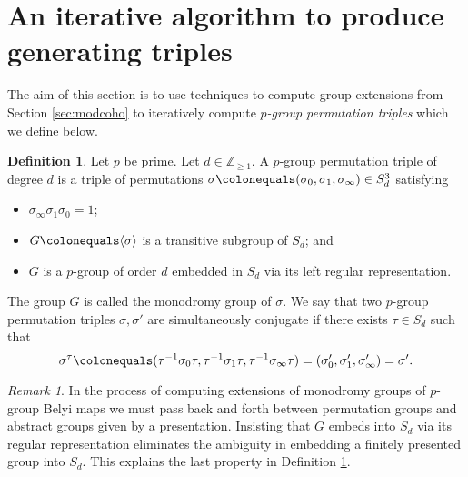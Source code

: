 \documentclass{dcthesis}
\newcommand{\ZZ}{\mathbb Z}
\newcommand{\defi}[1]{\textsf{#1}}
\numberwithin{equation}{section}
\theoremstyle{definition}
\newtheorem{definition}[equation]{Definition}
\theoremstyle{remark}
\newtheorem{remark}[equation]{Remark}
\begin{document}
{{  \section{An iterative algorithm to produce generating triples}{\label{sec:triplesalgorithm}
    The aim of this section is to use
    techniques to compute group
    extensions from Section \ref{sec:modcoho}
    to iteratively
    compute \emph{$p$-group permutation triples}
    which we define below.
    \begin{definition}
      \label{def:pgroupbelyitriple}
      Let $p$ be prime.
      Let $d\in\ZZ_{\geq 1}$.
      A \defi{$p$-group permutation triple}
      of degree $d$
      is a triple of permutations
      $\sigma\colonequals
      (\sigma_0,\sigma_1,\sigma_\infty)\in S_d^3$
      satisfying
      \begin{itemize}
        \item
          $\sigma_\infty\sigma_1\sigma_0=1$;
        \item
          $G\colonequals\langle\sigma\rangle$ is a transitive
          subgroup of $S_d$; and
        \item
          $G$ is a $p$-group
          of order $d$
          embedded in $S_d$
          via its left regular representation.
      \end{itemize}
      The group $G$ is called the
      \defi{monodromy group of $\sigma$}.
      We say that two $p$-group permutation triples
      $\sigma,\sigma'$ are \defi{simultaneously
      conjugate} if there exists $\tau\in S_d$ such that
      \begin{equation}\label{eqn:simconjbelyitriple}
        \sigma^\tau \colonequals
        (\tau^{-1}\sigma_0\tau, \tau^{-1}\sigma_1\tau, \tau^{-1}\sigma_\infty\tau)
        = \left(\sigma'_0,\sigma'_1,\sigma'_\infty\right)
        = \sigma'.
      \end{equation}
    \end{definition}
    \begin{remark}
      \label{rmk:leftregularrepn}
      In the process of computing extensions of
      monodromy groups of $p$-group Belyi maps
      we must pass back and forth
      between permutation groups
      and
      abstract groups given by a presentation.
      Insisting that $G$ embeds into $S_d$
      via its regular representation
      eliminates the ambiguity
      in embedding a finitely presented group
      into $S_d$.
      This explains the last property
      in Definition \ref{def:pgroupbelyitriple}.
    \end{remark}
}}}
\end{document}
